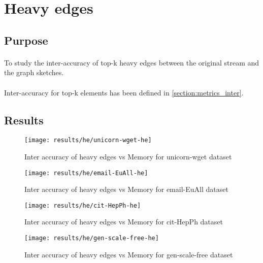 \section{Heavy edges}
\label{section:heavy_edges}

\subsection*{Purpose}

\paragraph{}
To study the inter-accuracy of top-k heavy edges between the original stream and the graph sketches.

\paragraph{}
Inter-accuracy for top-k elements has been defined in \autoref{section:metrics_inter}.

\subsection*{Results}

\begin{figure}[H]
    \centering \texttt{[image: results/he/unicorn-wget-he]}
    \vspace{-0.5cm}
    \caption{Inter accuracy of heavy edges vs Memory for unicorn-wget dataset}
    \label{fig:unicorn-wget-he}
\end{figure}

\begin{figure}[H]
    \centering \texttt{[image: results/he/email-EuAll-he]}
    \vspace{-0.5cm}
    \caption{Inter accuracy of heavy edges vs Memory for email-EuAll dataset}
    \label{fig:email-EuAll-he}
\end{figure}

\begin{figure}[H]
    \centering \texttt{[image: results/he/cit-HepPh-he]}
    \vspace{-0.5cm}
    \caption{Inter accuracy of heavy edges vs Memory for cit-HepPh dataset}
    \label{fig:cit-HepPh-he}
\end{figure}

\begin{figure}[H]
    \centering \texttt{[image: results/he/gen-scale-free-he]}
    \vspace{-0.5cm}
    \caption{Inter accuracy of heavy edges vs Memory for gen-scale-free dataset}
    \label{fig:gen-scale-free-he}
\end{figure}

